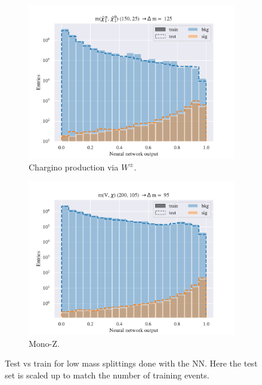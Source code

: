 \begin{figure}[H]
    \begin{subfigure}[t!]{0.49\textwidth}
        \includegraphics[width = \textwidth]{Figures/WW/NN/All_level/Low/scaled_train_test_395268.pdf}
        \caption{Chargino production via $W^\pm$.}
        \label{fig:WWNNLow}
    \end{subfigure}
    \begin{subfigure}[t!]{0.49\textwidth}
        \includegraphics[width = \textwidth]{Figures/Mono_Z/ML/NN/All_level/Low/scaled_train_test_310604.pdf}
        \caption{Mono-Z.}
        \label{fig:MonoZNNLow}
    \end{subfigure}
    \caption{Test vs train for low mass splittings done with the NN. Here the test set is scaled up to match the number of training events.}
    \label{fig:AllLowNN}
\end{figure}














